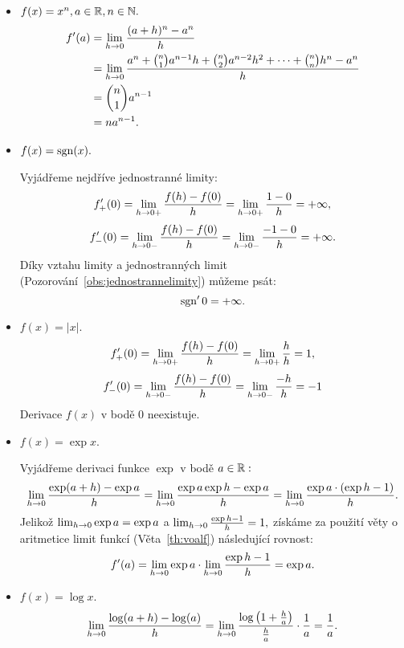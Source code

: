 \begin{remark}
    \leavevmode
    \begin{itemize}
        \item $f(x) = x^n, a \in \mathbb{R}, n \in \mathbb{N}.$
            \begin{align*}
                f'(a) &= \lim_{h \to 0} \frac{(a+h)^n - a^n}{h}  \\
                &= \lim_{h \to 0} \frac{a^n + \binom{n}{1}a^{n-1}h
                + \binom{n}{2}a^{n-2}h^2 + \dots + \binom{n}{n}h^n - a^n}{h} \\
                &=\binom{n}{1}a^{n-1} \\
                &=na^{n-1}.
            \end{align*}

        \item $f(x) = \operatorname{sgn}(x).$

            Vyjádřeme nejdříve jednostranné limity:
            $$f_+'(0) = \lim_{h \to 0+} \frac{f(h) - f(0)}{h} = \lim_{h \to 0+} \frac{1-0}{h} = 
            +\infty,$$
            $$f_-'(0) = \lim_{h \to 0-} \frac{f(h) - f(0)}{h} = \lim_{h \to 0-} \frac{-1-0}{h} = 
            +\infty.$$
            Díky vztahu limity a jednostranných limit 
            (Pozorování~\ref{obs:jednostrannelimity}) můžeme psát:
            $$\operatorname{sgn}' 0 = +\infty.$$

        \item $f(x) = |x|.$
            $$f_+'(0) = \lim_{h \to 0+} \frac{f(h) - f(0)}{h} = \lim_{h \to 0+} \frac{h}{h} = 1,$$
            $$f_-'(0) = \lim_{h \to 0-} \frac{f(h) - f(0)}{h} = \lim_{h \to 0-} \frac{-h}{h} = -1$$
            Derivace $f(x)$ v bodě $0$ neexistuje.

        \item $f(x) = \exp x.$

            Vyjádřeme derivaci funkce $\exp$ v bodě $a \in \mathbb{R}:$
            $$\lim_{h \to 0} \frac{\exp(a+h) - \exp a}{h} 
            = \lim_{h \to 0} \frac{\exp a \exp h - \exp a}{h} 
            = \lim_{h \to 0} \frac{\exp a \cdot (\exp h - 1)}{h}.$$
            Jelikož $\lim_{h \to 0} \exp a = \exp a$ a 
            $\lim_{h \to 0} \frac{\exp h - 1}{h} = 1,$ získáme za použití
            věty o aritmetice limit funkcí (Věta~\ref{th:voalf}) následující rovnost:
            $$f'(a) = \lim_{h \to 0} \exp a \cdot \lim_{h \to 0} \frac{\exp h -1}{h} = \exp a.$$

        \item $f(x) = \log x.$
            $$\lim_{h \to 0} \frac{\log(a+h) - \log(a)}{h} 
            = \lim_{h \to 0} \frac{\log\left(1 + \frac{h}{a}\right)}{\frac{h}{a}}\cdot \frac{1}{a}
            = \frac{1}{a}.$$
   \end{itemize}
\end{remark}

